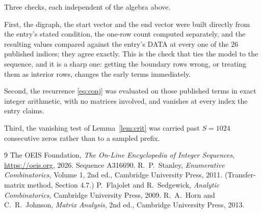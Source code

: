 \documentclass[11pt,a4paper]{article}
\theoremstyle{plain}
\theoremstyle{definition}
\begin{document}
Three checks, each independent of the algebra above.

First, the digraph, the start vector and the end vector were built directly from the
entry's stated condition, the one-row count computed separately, and the resulting values
compared against the entry's DATA at every one of the $26$ published indices; they
agree exactly. This is the check that ties the model to the sequence, and it is a sharp one:
getting the boundary rows wrong, or treating them as interior rows, changes the early terms
immediately.

Second, the recurrence \eqref{eq:conj} was evaluated on those published terms in exact
integer arithmetic, with no matrices involved, and vanishes at every index the entry claims.

Third, the vanishing test of Lemma~\ref{lem:crit} was carried past $S=1024$ consecutive
zeros rather than to a sampled prefix.

\begin{thebibliography}{9}
 The OEIS Foundation, \emph{The On-Line Encyclopedia of Integer
Sequences}, \url{https://oeis.org}, 2026. Sequence A316690.
 R.~P.~Stanley, \emph{Enumerative Combinatorics}, Volume 1, 2nd ed.,
Cambridge University Press, 2011. (Transfer-matrix method, Section 4.7.)
 P.~Flajolet and R.~Sedgewick, \emph{Analytic Combinatorics}, Cambridge
University Press, 2009.
 R.~A.~Horn and C.~R.~Johnson, \emph{Matrix Analysis}, 2nd ed., Cambridge
University Press, 2013.
\end{thebibliography}
\end{document}
